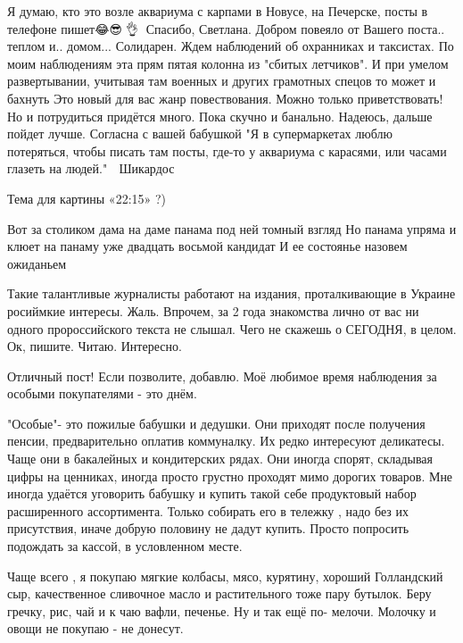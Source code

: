 \begin{itemize}
Я думаю, кто это возле аквариума с карпами в Новусе, на Печерске, посты в телефоне пишет😂😎🤘👌🔝
Спасибо, Светлана. Добром повеяло от Вашего поста.. теплом и.. домом...
Солидарен. Ждем наблюдений об охранниках и таксистах. По моим наблюдениям эта прям пятая колонна из "сбитых летчиков". И при умелом развертывании, учитывая там военных и других грамотных спецов то может и бахнуть
Это новый для вас жанр повествования. Можно только приветствовать! Но и потрудиться придётся много. Пока скучно и банально. Надеюсь, дальше пойдет лучше.
Согласна с вашей бабушкой
"Я в супермаркетах люблю потеряться, чтобы писать там посты, где-то у аквариума с карасями, или часами глазеть на людей." 🤦
Шикардос

Тема для картины «22:15» ?)


Вот за столиком дама на даме панама под ней томный взгляд
Но панама упряма и клюет на панаму уже двадцать восьмой кандидат
И ее состоянье назовем ожиданьем


Такие талантливые журналисты работают на издания, проталкивающие в Украине росиймкие интересы.
Жаль.
Впрочем, за 2 года знакомства лично от вас ни одного пророссийского текста не слышал.
Чего не скажешь о СЕГОДНЯ, в целом.
Ок, пишите. Читаю. Интересно.


Отличный пост!
Если позволите, добавлю.
Моё любимое время наблюдения за особыми покупателями - это днём.

"Особые"- это пожилые бабушки и дедушки. Они приходят после получения пенсии,
предварительно оплатив коммуналку. Их редко интересуют деликатесы. Чаще они в
бакалейных и кондитерских рядах. Они иногда спорят, складывая цифры на
ценниках, иногда просто грустно проходят мимо дорогих товаров. Мне иногда
удаётся уговорить бабушку и купить такой себе продуктовый набор расширенного
ассортимента. Только собирать его в тележку , надо без их присутствия, иначе
добрую половину не дадут купить. Просто попросить подождать за кассой, в
условленном месте.

Чаще всего , я покупаю мягкие колбасы, мясо, курятину, хороший Голландский сыр,
качественное сливочное масло и растительного тоже пару бутылок. Беру гречку,
рис, чай и к чаю вафли, печенье. Ну и так ещё по- мелочи. Молочку и овощи не
покупаю - не донесут.


\end{itemize}
